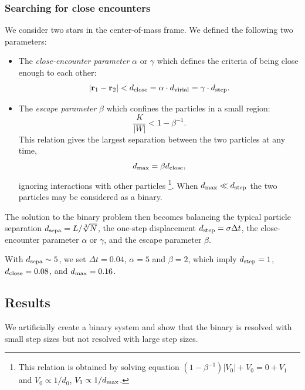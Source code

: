 \subsubsection*{Searching for close encounters}
We consider two stars in the center-of-mass frame. We defined the following two 
parameters:
\begin{itemize}
	\item The \textit{close-encounter parameter} $ \alpha $ or $ \gamma $ which defines the 
	criteria of being close enough to each other:
	\begin{equation}\label{eq:r12}
	| \mathbf{r}_1 - \mathbf{r}_2 | < d_{\rm close} = \alpha \cdot d_{\rm virial} = \gamma \cdot d_{\rm step}.
	\end{equation}
	\item The \textit{escape parameter} $ \beta $ which confines the particles in a small 
	region:
	\begin{equation}\label{key}
	\frac{K}{|W|} < 1 - \beta^{-1}.
	\end{equation}
	This relation gives the largest separation between the two particles at any time, 
	\begin{equation}
	d_{\rm max} = \beta d_{\rm close},
	\end{equation}
	ignoring interactions with other particles
	\footnote{This relation is obtained by solving  equation $ (1 - \beta^{-1}) |V_0| + V_0 = 0 
	+ V_1 $ and $ V_0 \propto 1/d_0 $,	$ V_1 \propto 1/d_{\rm max} $.}.
	When $ d_{\rm max} \ll d_{\rm step} $ the two particles may be considered as a 
	binary.
\end{itemize}

The solution to the binary problem then becomes balancing the typical particle 
separation $ d_{\rm sepa} = L/\sqrt[3]{N} $, the one-step displacement $ d_{\rm 
step} = \sigma \Delta t $, the close-encounter parameter $ \alpha $ or $ \gamma $, and 
the escape parameter $ \beta $.

With $ d_{\rm sepa} \sim 5 $, we set $ \Delta t = 0.04 $, $ \alpha = 5 $ and $ \beta = 2 $, 
which imply $ d_{\rm step} = 1 $, $ d_{\rm close} = 0.08 $, and $ d_{\rm max} = 0.16 $.

\subsection*{Results}
We artificially create a binary system and show that the binary is resolved with small step 
sizes but not resolved with large step sizes.

